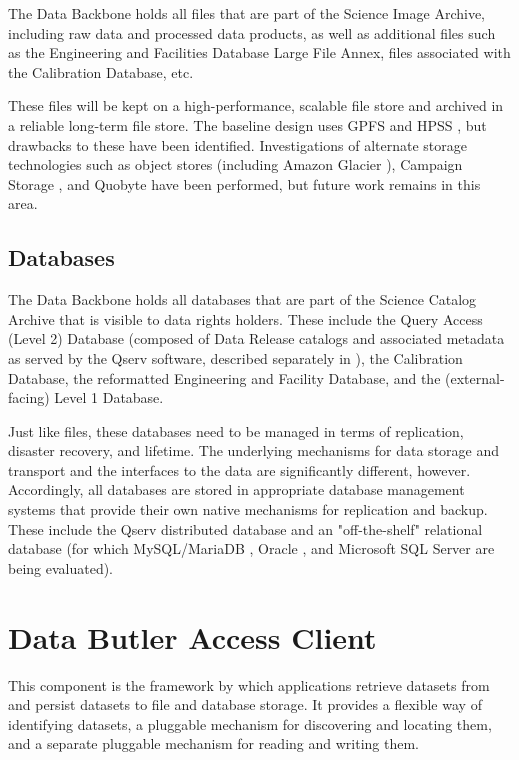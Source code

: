 \documentclass[DM,lsstdraft,toc]{lsstdoc}
\begin{document}
The Data Backbone holds all files that are part of the Science Image Archive,
including raw data and processed data products, as well as additional files
such as the Engineering and Facilities Database Large File Annex, files
associated with the Calibration Database, etc.

These files will be kept on a high-performance, scalable file store and
archived in a reliable long-term file store.  The baseline design uses GPFS
\citep{GPFS} and HPSS \citep{HPSS}, but drawbacks to these have been
identified.  Investigations of alternate storage technologies such as object
stores (including Amazon Glacier \citep{AmazonGlacier}), Campaign Storage
\citep{CampaignStorage}, and Quobyte \citep{Quobyte} have been performed, but
future work remains in this area.

\subsection{Databases}\label{dbb-databases}

The Data Backbone holds all databases that are part of the Science Catalog
Archive that is visible to data rights holders.  These include the Query Access
(Level 2) Database (composed of Data Release catalogs and associated metadata
as served by the Qserv software, described separately in ), the
Calibration Database, the reformatted Engineering and Facility Database, and
the (external-facing) Level 1 Database.

Just like files, these databases need to be managed in terms of replication,
disaster recovery, and lifetime.  The underlying mechanisms for data storage
and transport and the interfaces to the data are significantly different,
however.  Accordingly, all databases are stored in appropriate database
management systems that provide their own native mechanisms for replication and
backup.  These include the Qserv distributed database and an "off-the-shelf"
relational database (for which MySQL/MariaDB \citep{MariaDB}, Oracle
\citep{Oracle}, and Microsoft SQL Server \citep{SQLServer} are being
evaluated).


\section{Data Butler Access Client}\label{data-butler-access-client}

This component is the framework by which applications retrieve datasets from
and persist datasets to file and database storage.  It provides a flexible way
of identifying datasets, a pluggable mechanism for discovering and locating
them, and a separate pluggable mechanism for reading and writing them.
\end{document}
